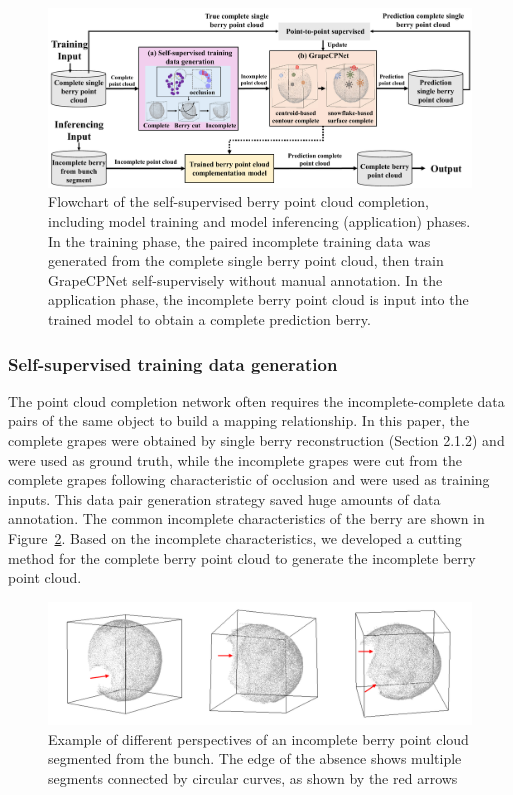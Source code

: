 \documentclass[12pt]{article}
\begin{document}
\begin{figure}[hbt!]
    \centering
    \includegraphics[width=1\textwidth]{figures/Figure7.pdf}
    \caption{Flowchart of the self-supervised berry point cloud completion, including model training and model inferencing (application) phases. In the training phase, the paired incomplete training data was generated from the complete single berry point cloud, then train GrapeCPNet self-supervisely without manual annotation. In the application phase, the incomplete berry point cloud is input into the trained model to obtain a complete prediction berry.}
    \label{fig:raw3}
\end{figure}

\subsubsection{Self-supervised training data generation}

The point cloud completion network often requires the incomplete-complete data pairs of the same object to build a mapping relationship. 
In this paper, the complete grapes were obtained by single berry reconstruction 
(Section 2.1.2) and were used as ground truth, while the incomplete grapes were cut from the complete grapes following characteristic of occlusion and were used as training inputs. 
This data pair generation strategy saved huge amounts of data annotation. The common incomplete characteristics of the berry are shown in Figure~\ref{fig:raw4}.
Based on the incomplete characteristics, we developed a cutting method for the complete berry point cloud to generate the incomplete berry point cloud.

\begin{figure}[hbt!]
    \centering
    \includegraphics[width=1\textwidth]{figures/Figure8.pdf}
    \caption{Example of different perspectives of an incomplete berry point cloud segmented from the bunch. The edge of the absence shows multiple segments connected by circular curves, as shown by the red arrows}
    \label{fig:raw4}
\end{figure}
\end{document}
